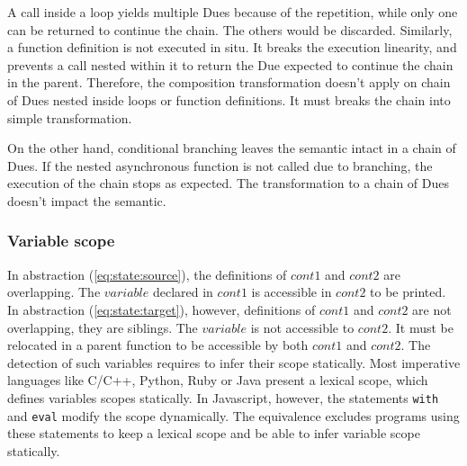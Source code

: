 A call inside a loop yields multiple Dues because of the repetition, while only one can be returned to continue the chain.
The others would be discarded.
Similarly, a function definition is not executed in situ.
It breaks the execution linearity, and prevents a call nested within it to return the Due expected to continue the chain in the parent.
Therefore, the composition transformation doesn't apply on chain of Dues nested inside loops or function definitions.
It must breaks the chain into simple transformation.

On the other hand, conditional branching leaves the semantic intact in a chain of Dues.
If the nested asynchronous function is not called due to branching, the execution of the chain stops as expected. %
The transformation to a chain of Dues doesn't impact the semantic.

\subsubsection{Variable scope}

In abstraction (\ref{eq:state:source}), the definitions of $cont1$ and $cont2$ are overlapping.
The $variable$ declared in $cont1$ is accessible in $cont2$ to be printed.
In abstraction (\ref{eq:state:target}), however, definitions of $cont1$ and $cont2$ are not overlapping, they are siblings.
The $variable$ is not accessible to $cont2$.
It must be relocated in a parent function to be accessible by both $cont1$ and $cont2$.
The detection of such variables requires to infer their scope statically.
Most imperative languages like C/C++, Python, Ruby or Java present a lexical scope, which defines variables scopes statically.
In Javascript, however, the statements \texttt{with} and \texttt{eval} modify the scope dynamically.
The equivalence excludes programs using these statements to keep a lexical scope and be able to infer variable scope statically.


